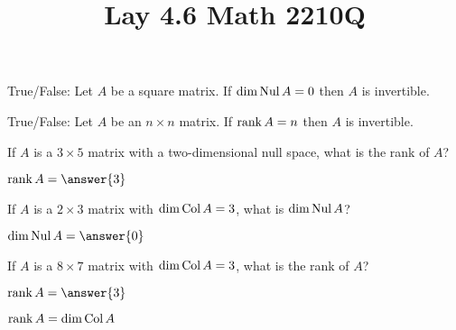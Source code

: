 \documentclass{ximera}
\newcommand{\Col}{\mathop{\rm Col}}
\newcommand{\Nul}{\mathop{\rm Nul}}
\newcommand{\rank}{\mathop{\rm rank}}
\begin{document}
  	\title{Lay 4.6  \hfill Math 2210Q} 
  	  		    \begin{question} True/False: Let $A$ be a square matrix. If $\dim \Nul A = 0$ then $A$ is invertible.
  	  		    	
  	  		    	\begin{multipleChoice}
  	  		    	\end{multipleChoice}
  	  		    	
  	  		    \end{question}	
  	  		    \begin{question} True/False: Let $A$ be an $n\times n$ matrix. If $\rank A = n$ then $A$ is invertible.
  	  		    	
  	  		    	\begin{multipleChoice}
  	  		    		\choice[correct]{True}
  	  		    		\choice{False}
  	  		    	\end{multipleChoice}
  	  		    	
  	  		    \end{question}	
  	  		      \begin{question} If $A$ is  a $3\times 5$ matrix with a two-dimensional null space, what is the rank of $A$?
  	  		      	
  	  		     $\rank A = \answer{3}$
  	  		      	
  	  		      \end{question}	
  	  		       \begin{question} If $A$ is  a $2\times 3$ matrix with $\dim \Col A = 3$, what is $\dim \Nul A$?
  	  		       	
  	  		       	$\dim\Nul A = \answer{0}$
  	  		       	
  	  		       \end{question}	
  	  		        \begin{question} If $A$ is  a $8\times 7$ matrix with $\dim \Col A = 3$, what is the rank of $A$?
  	  		        	
  	  		        	$\rank A = \answer{3}$
  	  		        	
  	  		        	\vspace{10pt}
  	  		        	\begin{hint}
  	  		        		$\rank A = \dim \Col A$
  	  		        		\end{hint}
  	  		        \end{question}	
\end{document}
